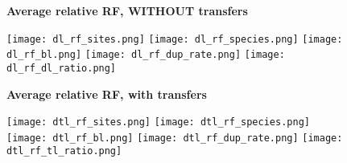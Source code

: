 \documentclass[12pt,a4paper]{article}
\begin{document}
\newcommand*{\figuretitle}[1]{%
    {\centering%
    \textbf{#1}%
    \par\medskip}%
}



\begin{figure}
\figuretitle{Average relative RF, WITHOUT transfers}
\texttt{[image: dl\_rf\_sites.png]}
\texttt{[image: dl\_rf\_species.png]}
\texttt{[image: dl\_rf\_bl.png]}
\texttt{[image: dl\_rf\_dup\_rate.png]}
\texttt{[image: dl\_rf\_dl\_ratio.png]}
\end{figure}


\begin{figure}
\figuretitle{Average relative RF, with transfers}
\texttt{[image: dtl\_rf\_sites.png]}
\texttt{[image: dtl\_rf\_species.png]}
\texttt{[image: dtl\_rf\_bl.png]}
\texttt{[image: dtl\_rf\_dup\_rate.png]}
\texttt{[image: dtl\_rf\_tl\_ratio.png]}
\end{figure}
\end{document}
